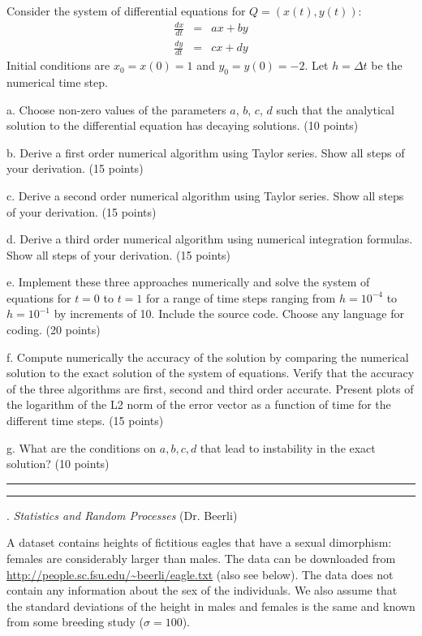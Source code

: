 \documentclass [11point]{article}
\begin{document}
Consider the system of differential equations for $Q=(x(t),y(t))$:
\begin{eqnarray}
\frac{dx}{dt} &=& a x + b y \nonumber \\\frac{dy}{dt} &=& c x + d y  \nonumber\end{eqnarray}
Initial conditions are $x_0 = x(0) = 1$ and $y_0 = y(0) = -2$. Let $h=\Delta t$ be the numerical
time step.\medskip

a. \quad Choose non-zero values of the parameters $a$, $b$, $c$, $d$ such that the analytical solution to the differential equation has decaying solutions. (10 points) \medskip

b. \quad Derive a first order numerical algorithm using Taylor series. Show all steps of your derivation. (15 points) \medskip

c. \quad Derive a second order numerical algorithm using Taylor series. Show all steps of your derivation. (15 points) \medskip

d. \quad Derive a third order numerical algorithm using numerical integration formulas. Show all steps of your derivation. (15 points) \medskip

e. \quad Implement these three approaches numerically and solve the system of equations for $t=0$ to $t=1$ for a range of time steps ranging from $h=10^{-4}$ to $h=10^{-1}$ by increments of 10. Include the source code. Choose any language for coding. (20 points) \medskip

f. \quad Compute numerically the accuracy of the solution by comparing the numerical solution to the exact solution of the system of equations. Verify that the accuracy of the three algorithms are first, second and third order accurate. Present plots of the logarithm of the L2 norm of the error vector as a function of time for the different time steps. (15 points) \medskip

g. \quad What are the conditions on $a,b,c,d$ that lead to instability in the exact solution? (10 points)


\bigskip
\hrule 

\pagebreak
\hrule 
{}. \textit{Statistics and Random Processes} (Dr. Beerli)
\bigskip

A dataset contains heights of fictitious eagles that have a sexual dimorphism: females are considerably larger than males. The data can be downloaded from \url{http://people.sc.fsu.edu/~beerli/eagle.txt} (also see below). The data does not contain any information about the sex of the individuals. We also assume that the standard deviations of the height in males and females is the same and known from some breeding study ($\sigma=100$).\medskip
\end{document}
